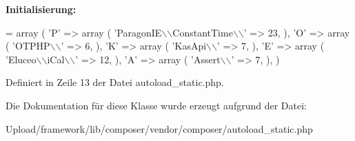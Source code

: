 {\bfseries Initialisierung\+:}
\begin{DoxyCode}
= array (
        \textcolor{charliteral}{'P'} => 
        array (
            \textcolor{stringliteral}{'ParagonIE\(\backslash\)\(\backslash\)ConstantTime\(\backslash\)\(\backslash\)'} => 23,
        ),
        \textcolor{charliteral}{'O'} => 
        array (
            \textcolor{stringliteral}{'OTPHP\(\backslash\)\(\backslash\)'} => 6,
        ),
        \textcolor{charliteral}{'K'} => 
        array (
            \textcolor{stringliteral}{'KasApi\(\backslash\)\(\backslash\)'} => 7,
        ),
        \textcolor{charliteral}{'E'} => 
        array (
            \textcolor{stringliteral}{'Eluceo\(\backslash\)\(\backslash\)iCal\(\backslash\)\(\backslash\)'} => 12,
        ),
        \textcolor{charliteral}{'A'} => 
        array (
            \textcolor{stringliteral}{'Assert\(\backslash\)\(\backslash\)'} => 7,
        ),
    )
\end{DoxyCode}


Definiert in Zeile 13 der Datei autoload\+\_\+static.\+php.



Die Dokumentation für diese Klasse wurde erzeugt aufgrund der Datei\+:\begin{DoxyCompactItemize}
\item 
Upload/framework/lib/composer/vendor/composer/autoload\+\_\+static.\+php\end{DoxyCompactItemize}

